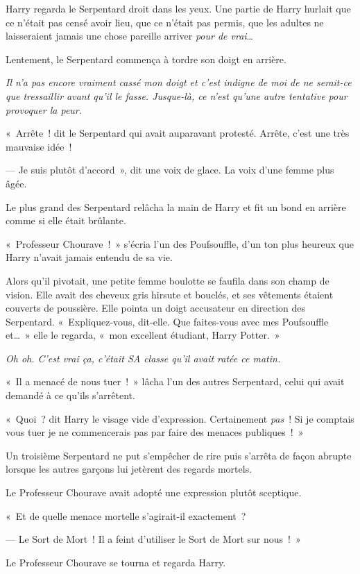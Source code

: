 Harry regarda le Serpentard droit dans les yeux. Une partie de Harry hurlait que ce n'était pas censé avoir lieu, que ce n'était pas permis, que les adultes ne laisseraient jamais une chose pareille arriver \emph{pour de vrai}…

Lentement, le Serpentard commença à tordre son doigt en arrière.

\emph{Il n'a pas encore vraiment cassé mon doigt et c'est indigne de moi de ne serait-ce que tressaillir avant qu'il le fasse. Jusque-là, ce n'est qu'une autre tentative pour provoquer la peur.}

«~Arrête~! dit le Serpentard qui avait auparavant protesté. Arrête, c'est une très mauvaise idée~!

--- Je suis plutôt d'accord~», dit une voix de glace. La voix d'une femme plus âgée.

Le plus grand des Serpentard relâcha la main de Harry et fit un bond en arrière comme si elle était brûlante.

«~Professeur Chourave~!~» s'écria l'un des Poufsouffle, d'un ton plus heureux que Harry n'avait jamais entendu de sa vie.

Alors qu'il pivotait, une petite femme boulotte se faufila dans son champ de vision. Elle avait des cheveux gris hirsute et bouclés, et ses vêtements étaient couverts de poussière. Elle pointa un doigt accusateur en direction des Serpentard. «~Expliquez-vous, dit-elle. Que faites-vous avec mes Poufsouffle et…~» elle le regarda, «~mon excellent étudiant, Harry Potter.~»

\emph{Oh oh. C'est vrai ça, c'était SA classe qu'il avait ratée ce matin.}

«~Il a menacé de nous tuer~!~» lâcha l'un des autres Serpentard, celui qui avait demandé à ce qu'ils s'arrêtent.

«~Quoi~? dit Harry le visage vide d'expression. Certainement \emph{pas}~! Si je comptais vous tuer je ne commencerais pas par faire des menaces publiques~!~»

Un troisième Serpentard ne put s'empêcher de rire puis s'arrêta de façon abrupte lorsque les autres garçons lui jetèrent des regards mortels.

Le Professeur Chourave avait adopté une expression plutôt sceptique.

«~Et de quelle menace mortelle s'agirait-il exactement~?

--- Le Sort de Mort~! Il a feint d'utiliser le Sort de Mort sur nous~!~»

Le Professeur Chourave se tourna et regarda Harry.

